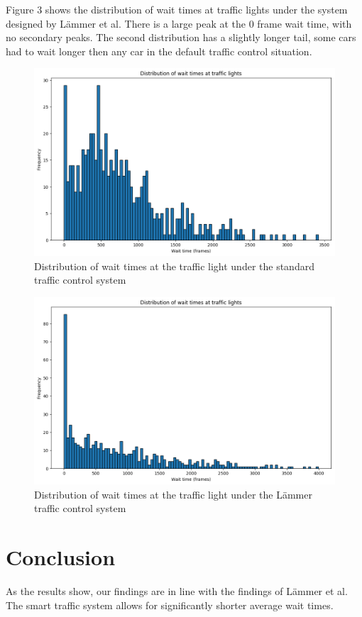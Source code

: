 \documentclass{article}
\begin{document}
Figure 3 shows the distribution of wait times at traffic lights under the system designed by L{\"a}mmer et al. There is a large peak at the 0 frame wait time, with no secondary peaks. The second distribution has a slightly longer tail, some cars had to wait longer then any car in the default traffic control situation.
\begin{figure}[h!]
\includegraphics[width=12cm]{default_54000frameswait_time.png}
\caption{Distribution of wait times at the traffic light under the standard traffic control system}
\end{figure}
\begin{figure}[h!]
\includegraphics[width=12cm]{Laemmer_54000frameswait_time.png}
\caption{Distribution of wait times at the traffic light under the L{\"a}mmer traffic control system}
\end{figure}

\FloatBarrier

\section{Conclusion}
As the results show, our findings are in line with the findings of L{\"a}mmer et al. The smart traffic system allows for significantly shorter average wait times.
\end{document}
